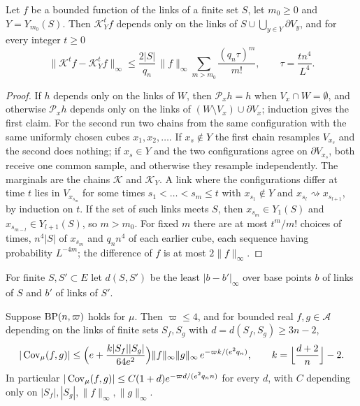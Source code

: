 \begin{lemma}\label{lem:speed}
Let $f$ be a bounded function of the links of a finite set $S$, let $m_0\ge0$
and $Y=Y_{m_0}(S)$. Then $\mathcal K_Y^tf$ depends only on the links of
$S\cup\bigcup_{y\in Y}\partial V_y$, and for every integer $t\ge0$
\[
\bigl\|\mathcal K^tf-\mathcal K_Y^tf\bigr\|_\infty\le\frac{2|S|}{q_n}\,\|f\|_\infty
\sum_{m>m_0}\frac{(q_n\tau)^m}{m!},\qquad\tau=\frac{tn^4}{L^4}.
\]
\end{lemma}

\begin{proof}
If $h$ depends only on the links of $W$, then $\mathcal P_xh=h$ when $V_x\cap W=
\emptyset$, and otherwise $\mathcal P_xh$ depends only on the links of $(W\setminus
V_x)\cup\partial V_x$; induction gives the first claim. For the second run two
chains from the same configuration with the same uniformly chosen cubes
$x_1,x_2,\dots$. If $x_s\notin Y$ the first chain resamples $V_{x_s}$ and the
second does nothing; if $x_s\in Y$ and the two configurations agree on
$\partial V_{x_s}$, both receive one common sample, and otherwise they resample
independently. The marginals are the chains $\mathcal K$ and $\mathcal K_Y$. A
link where the configurations differ at time $t$ lies in $V_{x_{s_m}}$ for some
times $s_1<\dots<s_m\le t$ with $x_{s_1}\notin Y$ and $x_{s_l}\rightsquigarrow
x_{s_{l+1}}$, by induction on $t$. If the set of such links meets $S$, then
$x_{s_m}\in Y_1(S)$ and $x_{s_{m-l}}\in Y_{l+1}(S)$, so $m>m_0$. For fixed $m$
there are at most $t^m/m!$ choices of times, $n^4|S|$ of $x_{s_m}$ and $q_nn^4$
of each earlier cube, each sequence having probability $L^{-4m}$; the
difference of $f$ is at most $2\|f\|_\infty$.
\end{proof}

For finite $S,S'\subset E$ let $d(S,S')$ be the least $|b-b'|_\infty$ over base
points $b$ of links of $S$ and $b'$ of links of $S'$.

\begin{theorem}\label{thm:decay}
Suppose $\mathrm{BP}(n,\varpi)$ holds for $\mu$. Then $\varpi\le4$, and for bounded
real $f,g\in\mathcal A$ depending on the links of finite sets $S_f,S_g$ with
$d=d(S_f,S_g)\ge3n-2$,
\[
|\operatorname{Cov}_\mu(f,g)|\le\Bigl(e+\frac{k|S_f||S_g|}{64e^2}\Bigr)\|f\|_\infty\|g\|_\infty\,
e^{-\varpi k/(e^2q_n)},\qquad k=\Bigl\lfloor\frac{d+2}n\Bigr\rfloor-2 .
\]
In particular $|\operatorname{Cov}_\mu(f,g)|\le C(1+d)e^{-\varpi d/(e^2q_nn)}$ for every $d$,
with $C$ depending only on $|S_f|,|S_g|,\|f\|_\infty,\|g\|_\infty$.
\end{theorem}

